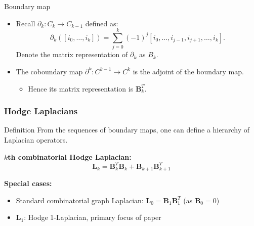 \documentclass[aspectratio=169,xcolor=dvipsnames]{beamer}
\def\B{\boldsymbol{B}}
\begin{document}
\begin{frame}{Boundary map}

    \begin{itemize}
        \item Recall $\partial_k:C_k\to C_{k-1}$ defined as: 
    \[\partial_k([i_0, \ldots, i_k]) = \sum_{j=0}^{k} (-1)^j[i_0, \ldots, i_{j-1}, i_{j+1}, \ldots, i_k].\]
    Denote the matrix representation of $\partial_k$ as $B_k$. 
    
    \item The coboundary map $\partial^k:C^{k-1}\to C^k$ is the adjoint of the boundary map. 
    \begin{itemize}
        \item Hence its matrix representation is $\B_k^T$. 
    \end{itemize}
    \end{itemize}
\end{frame}


\begin{frame}
\frametitle{Hodge Laplacians}

\begin{block}{Definition}
From the sequences of boundary maps, one can define a hierarchy of Laplacian operators. 

\vspace{0.2cm}
\textbf{$k$th combinatorial Hodge Laplacian:}
\begin{equation*}
\boldsymbol{L}_k = \boldsymbol{B}_k^{T} \boldsymbol{B}_k + \boldsymbol{B}_{k+1} \boldsymbol{B}_{k+1}^{T}
\end{equation*}

\textbf{Special cases:}
\begin{itemize}
    \item Standard combinatorial graph Laplacian: $\boldsymbol{L}_0 = \boldsymbol{B}_1 \boldsymbol{B}_1^{T}$ (as $\boldsymbol{B}_0 = 0$)
    \item $\boldsymbol{L}_1$: Hodge 1-Laplacian, primary focus of paper
\end{itemize}
\end{block}

\end{frame}
\end{document}
